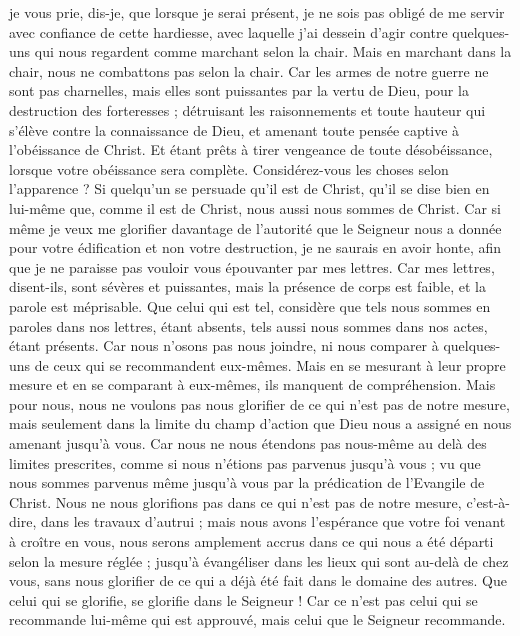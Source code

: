 \begin{multicols}{2}
je vous prie, dis-je, que lorsque je serai présent, je ne sois pas obligé de me servir avec confiance de cette hardiesse, avec laquelle j'ai dessein d'agir contre quelques-uns qui nous regardent comme marchant selon la chair.
Mais en marchant dans la chair, nous ne combattons pas selon la chair.
Car les armes de notre guerre ne sont pas charnelles, mais elles sont puissantes par la vertu de Dieu, pour la destruction des forteresses ;
détruisant les raisonnements et toute hauteur qui s'élève contre la connaissance de Dieu, et amenant toute pensée captive à l'obéissance de Christ.
Et étant prêts à tirer vengeance de toute désobéissance, lorsque votre obéissance sera complète.
Considérez-vous les choses selon l'apparence ? Si quelqu'un se persuade qu'il est de Christ, qu'il se dise bien en lui-même que, comme il est de Christ, nous aussi nous sommes de Christ.
Car si même je veux me glorifier davantage de l'autorité que le Seigneur nous a donnée pour votre édification et non votre destruction, je ne saurais en avoir honte,
afin que je ne paraisse pas vouloir vous épouvanter par mes lettres.
Car mes lettres, disent-ils, sont sévères et puissantes, mais la présence de corps est faible, et la parole est méprisable.
Que celui qui est tel, considère que tels nous sommes en paroles dans nos lettres, étant absents, tels aussi nous sommes dans nos actes, étant présents.
Car nous n'osons pas nous joindre, ni nous comparer à quelques-uns de ceux qui se recommandent eux-mêmes. Mais en se mesurant à leur propre mesure et en se comparant à eux-mêmes, ils manquent de compréhension.
Mais pour nous, nous ne voulons pas nous glorifier de ce qui n'est pas de notre mesure, mais seulement dans la limite du champ d'action que Dieu nous a assigné en nous amenant jusqu'à vous.
Car nous ne nous étendons pas nous-même au delà des limites prescrites, comme si nous n'étions pas parvenus jusqu'à vous ; vu que nous sommes parvenus même jusqu'à vous par la prédication de l'Evangile de Christ.
Nous ne nous glorifions pas dans ce qui n'est pas de notre mesure, c'est-à-dire, dans les travaux d'autrui ; mais nous avons l'espérance que votre foi venant à croître en vous, nous serons amplement accrus dans ce qui nous a été départi selon la mesure réglée ;
jusqu'à évangéliser dans les lieux qui sont au-delà de chez vous, sans nous glorifier de ce qui a déjà été fait dans le domaine des autres.
Que celui qui se glorifie, se glorifie dans le Seigneur !
Car ce n'est pas celui qui se recommande lui-même qui est approuvé, mais celui que le Seigneur recommande.

\end{multicols}
